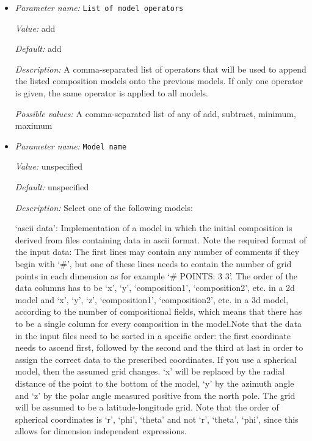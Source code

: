 \begin{itemize}
{\it Possible values:} A comma-separated list of any of ascii data, function, porosity
\item {\it Parameter name:} {\tt List of model operators}
\label{parameters:Initial composition model/List of model operators}
\label{parameters:Initial_20composition_20model/List_20of_20model_20operators}


{\it Value:} add


{\it Default:} add


{\it Description:} A comma-separated list of operators that will be used to append the listed composition models onto the previous models. If only one operator is given, the same operator is applied to all models.


{\it Possible values:} A comma-separated list of any of add, subtract, minimum, maximum
\item {\it Parameter name:} {\tt Model name}
\label{parameters:Initial composition model/Model name}
\label{parameters:Initial_20composition_20model/Model_20name}


{\it Value:} unspecified


{\it Default:} unspecified


{\it Description:} Select one of the following models:

`ascii data': Implementation of a model in which the initial composition is derived from files containing data in ascii format. Note the required format of the input data: The first lines may contain any number of comments if they begin with `#', but one of these lines needs to contain the number of grid points in each dimension as for example `# POINTS: 3 3'. The order of the data columns has to be `x', `y', `composition1', `composition2', etc. in a 2d model and `x', `y', `z', `composition1', `composition2', etc. in a 3d model, according to the number of compositional fields, which means that there has to be a single column for every composition in the model.Note that the data in the input files need to be sorted in a specific order: the first coordinate needs to ascend first, followed by the second and the third at last in order to assign the correct data to the prescribed coordinates. If you use a spherical model, then the assumed grid changes. `x' will be replaced by the radial distance of the point to the bottom of the model, `y' by the azimuth angle and `z' by the polar angle measured positive from the north pole. The grid will be assumed to be a latitude-longitude grid. Note that the order of spherical coordinates is `r', `phi', `theta' and not `r', `theta', `phi', since this allows for dimension independent expressions.


\end{itemize}
